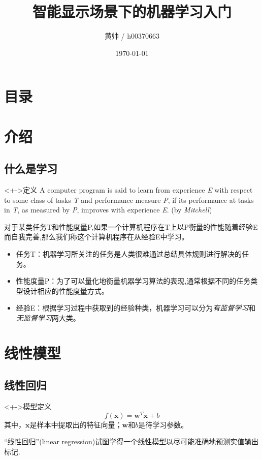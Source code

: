 \documentclass{beamer}
\title{智能显示场景下的机器学习入门}
\author{黄帅 / h00370663}
\date{\today}
\begin{document}
\begin{frame}
\titlepage
\end{frame}

\section*{目录}
    \begin{frame}
        \tableofcontents
    \end{frame}

\section{介绍}
    \subsection{什么是学习}
    \begin{frame}
        \begin{block}<+->{定义}
            A computer program is said to learn from experience \textit E with respect to some class of tasks \textit T and performance measure \textit P, if its performance at tasks in \textit T, as measured by \textit P, improves with experience \textit E. (by \textit{Mitchell})
        \end{block}
        对于某类任务T和性能度量P,如果一个计算机程序在T上以P衡量的性能随着经验E而自我完善,那么我们称这个计算机程序在从经验E中学习。
        \begin{itemize}
            \item 任务T：机器学习所关注的任务是人类很难通过总结具体规则进行解决的任务。
            \item 性能度量P：为了可以量化地衡量机器学习算法的表现,通常根据不同的任务类型设计相应的性能度量方式。
            \item 经验E：根据学习过程中获取到的经验种类，机器学习可以分为\textit{有监督学习}和\textit{无监督学习}两大类。
        \end{itemize}
    \end{frame}

\section{线性模型}
    \subsection{线性回归}
    \begin{frame}
        \begin{block}<+->{模型定义}
            \begin{equation}
                f(\bm x)=\bm{w}^T\bm{x}+b
            \end{equation}
            其中，$\bm x$是样本中提取出的特征向量；$\bm w$和$b$是待学习参数。
        \end{block}
        ``线性回归''(linear regression)试图学得一个线性模型以尽可能准确地预测实值输出标记.
    \end{frame}
\end{document}
